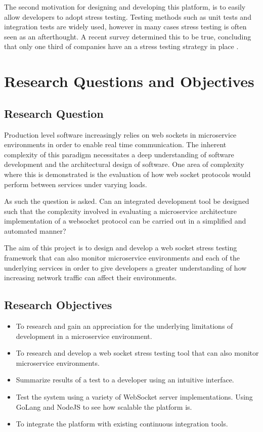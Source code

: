 The second motivation for designing and developing this platform, is to easily allow developers to adopt stress testing. Testing methods such as unit tests and integration tests are widely used, however in many cases stress testing is often seen as an afterthought. A recent survey determined this to be true, concluding that only one third of companies have an a stress testing strategy in place \cite{bezemer2019performance}.

\section{Research Questions and Objectives}

\subsection{Research Question}

Production level software increasingly relies on web sockets in microservice environments in order to enable real time communication. The inherent complexity of this paradigm necessitates a deep understanding of software development and the architectural design of software. One area of complexity where this is demonstrated is the evaluation of how web socket protocols would perform between services under varying loads. 

As such the question is asked. Can an integrated development tool be designed such that the complexity involved in evaluating a microservice architecture implementation of a websocket protocol can be carried out in a simplified and automated manner?

The aim of this project is to design and develop a web socket stress testing framework that can also monitor microservice environments and each of the underlying services in order to give developers a greater understanding of how increasing network traffic can affect their environments.

\subsection{Research Objectives}

\begin{itemize}
  \item To research and gain an appreciation for the underlying limitations of development in a microservice environment.
  \item To research and develop a web socket stress testing tool that can also monitor microservice environments.
  \item Summarize results of a test to a developer using an intuitive interface.
  \item Test the system using a variety of WebSocket server implementations. Using GoLang and NodeJS to see how scalable the platform is.
  \item To integrate the platform with existing continuous integration tools.
\end{itemize}

